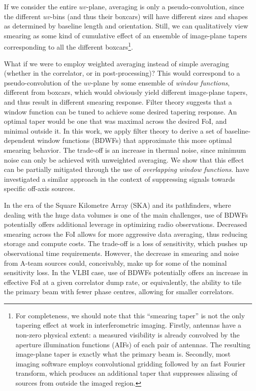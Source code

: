 \documentclass[useAMS,usenatbib]{mn2e}
\begin{document}
If we consider the entire $uv$-plane, averaging is only a pseudo-convolution, since the different $uv$-bins (and thus
their boxcars) will have different sizes and shapes as determined by baseline length and orientation. Still, we can 
qualitatively view smearing  as some kind of cumulative effect of an ensemble of image-plane tapers corresponding to all the 
different boxcars\footnote{For completeness, we should note that  this ``smearing taper'' is not the only tapering effect 
at work in interferometric imaging. Firstly, antennas have a non-zero 
physical extent: a measured visibility is already convolved by the aperture illumination functions (AIFs) of each pair of 
antennas. The resulting image-plane taper is exactly what the primary beam is. Secondly, most imaging software employs 
convolutional gridding followed by an fast Fourier transform, which produces an additional taper that suppresses aliasing of sources from 
outside the imaged region.}. 

What if we were to employ weighted averaging instead of simple averaging (whether in the correlator, or in post-processing)? 
This would correspond to a  pseudo-convolution of the $uv$-plane by some ensemble of \emph{window functions}, 
different from boxcars, which would obviously yield different image-plane tapers, and thus result in different 
smearing response. Filter theory suggests that a window function can be tuned to achieve some desired tapering response. 
An optimal taper would be one that was maximal across the desired FoI, and minimal outside it. In this work, 
we apply filter theory to derive a set of baseline-dependent window functions (BDWFs) that approximate this more optimal smearing 
behavior. The trade-off is an increase in thermal noise, since minimum noise can only be achieved with 
unweighted averaging. We show that this effect can be partially mitigated through the use of \emph{overlapping window functions}. 
\citet{offringa-filtering} have investigated a similar approach in the context of suppressing signals towards specific off-axis
sources. 

In the era of the Square Kilometre Array (SKA) and its pathfinders, where dealing with the huge data volumes is one of
the main challenges, use of BDWFs potentially offers additional leverage in optimizing radio observations. 
Decreased smearing across the FoI allows for more aggressive data averaging, thus reducing storage and compute costs. 
The trade-off is a loss of sensitivity, which pushes up observational time requirements. However, the decrease in smearing
and noise from A-team sources could, conceivably, make up for some of the nominal sensitivity loss. 
In the VLBI case, use of BDWFs potentially offers an increase in effective FoI at a given correlator dump rate, or 
equivalently, the ability to tile the primary beam with fewer phase centres, allowing
for smaller correlators.
\end{document}
